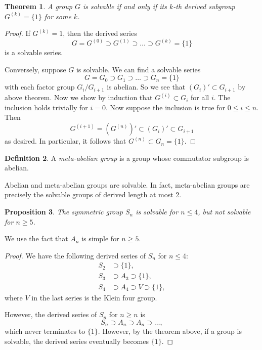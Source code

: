 \documentclass[12pt]{report}
\newtheorem{theorem}{Theorem}[section]
\newtheorem{proposition}[theorem]{Proposition}
{\theoremstyle{remark}\newtheorem*{remark}{Remark}}
\theoremstyle{definition}
\newtheorem{definition}[theorem]{Definition}
\begin{document}
\begin{theorem}
	A group $G$ is solvable if and only if its $k$-th derived subgroup $G^{(k)}=\{1\}$ for some $k$.
\end{theorem}

\begin{proof}
	If $G^{(k)}=1$, then the derived series
	$$G=G^{(0)}\supset G^{(1)}\supset \dots\supset G^{(k)}=\{1\}$$ is a solvable series.

	Conversely, suppose $G$ is solvable. We can find a solvable series
	\[G=G_0\supset G_1\supset \dots\supset G_n=\{1\}\] with each factor group $G_i/G_{i+1}$ is abelian. So we see that $(G_i)'\subset G_{i+1}$ by above theorem. Now we show by induction that $G^{(i)}\subset G_i$ for all $i$. The inclusion holds trivially for $i=0$. Now suppose the inclusion is true for $0\leq i\leq n$. Then $$G^{(i+1)}=(G^{(n)})' \subset (G_i)'\subset G_{i+1}$$  as desired. In particular, it follows that $G^{(n)}\subset G_n=\{1\}$.
\end{proof}

\begin{definition}
	A \emph{meta-abelian group} is a group whose commutator subgroup is abelian.
\end{definition}

Abelian and meta-abelian groups are solvable. In fact, meta-abelian groups are precisely the solvable groups of derived length at most 2.

\begin{proposition}
	The symmetric group $S_n$ is solvable for $n\leq 4$, but not solvable for $n\geq 5$.
\end{proposition}

\begin{remark}
	We use the fact that $A_n$ is simple for $n\geq 5$.
\end{remark}

\begin{proof}
	We have the following derived series of $S_n$ for $n\leq 4$:
	\begin{align*}
		S_2 & \supset \{1\},                     \\
		S_3 & \supset A_3\supset \{1\},          \\
		S_4 & \supset A_4\supset V\supset \{1\},
	\end{align*}
	where $V$ in the last series is the Klein four group.

	However, the derived series of $S_n$ for $n\geq n$ is
	$$S_n \supset A_n \supset A_n \supset \dots,$$
	which never terminates to $\{1\}$. However, by the theorem above, if a group is solvable, the derived series eventually becomes $\{1\}$.
\end{proof}
\end{document}
